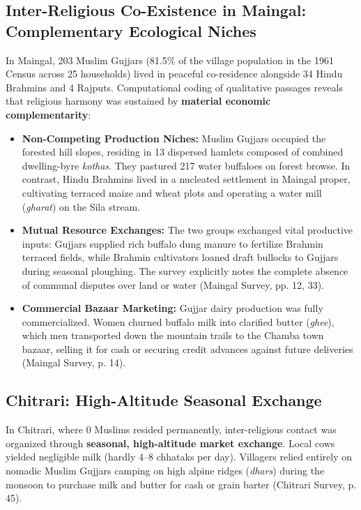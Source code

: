 \documentclass[11pt,a4paper]{article}
\begin{document}
\subsection{Inter-Religious Co-Existence in Maingal: Complementary Ecological Niches}
In Maingal, 203 Muslim Gujjars (81.5\% of the village population in the 1961 Census across 25 households) lived in peaceful co-residence alongside 34 Hindu Brahmins and 4 Rajputs. Computational coding of qualitative passages reveals that religious harmony was sustained by \textbf{material economic complementarity}:
\begin{itemize}[leftmargin=*]
    \item \textbf{Non-Competing Production Niches:} Muslim Gujjars occupied the forested hill slopes, residing in 13 dispersed hamlets composed of combined dwelling-byre \textit{kothas}. They pastured 217 water buffaloes on forest browse. In contrast, Hindu Brahmins lived in a nucleated settlement in Maingal proper, cultivating terraced maize and wheat plots and operating a water mill (\textit{gharat}) on the Sila stream.
    \item \textbf{Mutual Resource Exchanges:} The two groups exchanged vital productive inputs: Gujjars supplied rich buffalo dung manure to fertilize Brahmin terraced fields, while Brahmin cultivators loaned draft bullocks to Gujjars during seasonal ploughing. The survey explicitly notes the complete absence of communal disputes over land or water (Maingal Survey, pp. 12, 33).
    \item \textbf{Commercial Bazaar Marketing:} Gujjar dairy production was fully commercialized. Women churned buffalo milk into clarified butter (\textit{ghee}), which men transported down the mountain trails to the Chamba town bazaar, selling it for cash or securing credit advances against future deliveries (Maingal Survey, p. 14).
\end{itemize}

\subsection{Chitrari: High-Altitude Seasonal Exchange}
In Chitrari, where 0 Muslims resided permanently, inter-religious contact was organized through \textbf{seasonal, high-altitude market exchange}. Local cows yielded negligible milk (hardly 4--8 chhataks per day). Villagers relied entirely on nomadic Muslim Gujjars camping on high alpine ridges (\textit{dhars}) during the monsoon to purchase milk and butter for cash or grain barter (Chitrari Survey, p. 45).
\end{document}
